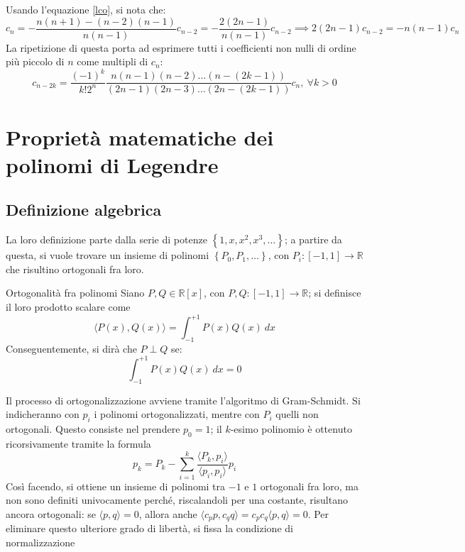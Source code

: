 \documentclass[11pt, a4paper]{scrartcl}
\theoremstyle{definition}
\numberwithin{esempio}{section}
\theoremstyle{definition}
\numberwithin{obs}{section}
\numberwithin{nota}{section}
\numberwithin{equation}{subsection}
\begin{document}
Usando l'equazione \ref{lco}, si nota che:
\[
c_n = - \frac{n(n+1) - (n-2)(n-1)}{n(n-1)} c_{n-2}  = -\frac{ 2(2n -1)}{n(n-1)}c_{n-2 }  \implies 2(2n-1)c_{n-2} = - n(n-1) c_n
\] 
La ripetizione di questa porta ad esprimere tutti i coefficienti non nulli di ordine pi\`u piccolo di $n$ come multipli di $c_n$:
\[
	c_{n-2k} = \frac{(-1)^k}{k!2^n}\frac{n(n-1)(n-2) \ldots (n-(2k-1))}{(2n-1)(2n-3)\ldots(2n-(2k-1))}c_n , \ \forall k > 0
\] 

\newpage
\section{Propriet\`a matematiche dei polinomi di Legendre}
\subsection{Definizione algebrica}
La loro definizione parte dalla serie di potenze $\left\{ 1,x,x^2,x^3,\ldots \right\} $; a partire da questa, si vuole trovare un insieme di polinomi $\left\{ P_0, P_1,\ldots \right\} $, con $P_i:\left[ -1,1 \right] \to \mathbb{R}$ che risultino ortogonali fra loro.
\begin{definizione}
	{Ortogonalit\`a fra polinomi}{}
	Siano $P, Q\in \mathbb{R}[x]$, con $P,Q:[-1,1]\to \mathbb{R}$; si definisce il loro prodotto scalare come
	\begin{equation}
		\langle P(x) ,Q(x) \rangle = \int_{-1} ^{+1} P(x) Q(x) \ dx 
	\end{equation}
	Conseguentemente, si dir\`a che $P \perp Q$ se:
	\begin{equation}
		\int_{-1} ^{+1} P(x) Q(x) \ dx = 0
	\end{equation}
\end{definizione}
Il processo di ortogonalizzazione avviene tramite l'algoritmo di Gram-Schmidt.
Si indicheranno con $p_i$ i polinomi ortogonalizzati, mentre con $P_i$ quelli non ortogonali.
Questo consiste nel prendere $p_0 = 1$; il $k$-esimo polinomio \`e ottenuto ricorsivamente tramite la formula
\begin{equation}
	p_k = P_k - \sum_{i=1}^{k} \frac{\langle P_k, p_i \rangle}{\langle p_i , p_i \rangle}p_i
\end{equation}
Cos\`i facendo, si ottiene un insieme di polinomi tra $-1$ e $1$ ortogonali fra loro, ma non sono definiti univocamente perch\'e, riscalandoli per una costante, risultano ancora ortogonali: se $\langle p,q \rangle=0$, allora anche $\langle c_pp,c_q q \rangle=c_pc_q\langle p,q \rangle=0$.
Per eliminare questo ulteriore grado di libert\`a, si fissa la condizione di normalizzazione 
\end{document}
